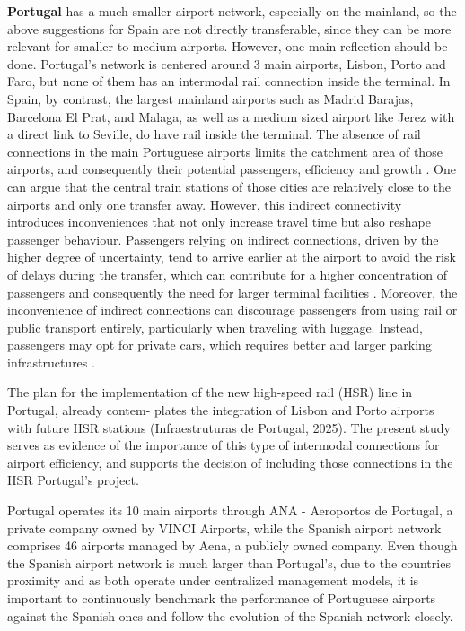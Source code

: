 \textbf{Portugal} has a much smaller airport network, especially on the mainland, so the above suggestions
for Spain are not directly transferable, since they can be more relevant for smaller to medium airports.
However, one main reflection should be done. Portugal's network is centered around 3 main airports, Lisbon, Porto and Faro, but none of them has an intermodal rail connection inside
the terminal. In Spain, by contrast, the largest mainland airports such as Madrid Barajas, Barcelona El
Prat, and Malaga, as well as a medium sized airport like Jerez with a direct link to Seville, do have rail
inside the terminal. The absence of rail connections in the main Portuguese airports limits the catchment
area of those airports, and consequently their potential passengers, efficiency and growth \cite{fernandez2022}. One can argue that the central train stations of those cities are relatively close to the airports and
only one transfer away. However, this indirect connectivity introduces inconveniences that not only increase travel time but also reshape passenger behaviour. Passengers relying on indirect connections,
driven by the higher degree of uncertainty, tend to arrive earlier at the airport to avoid the risk of delays
during the transfer, which can contribute for a higher concentration of passengers and consequently the
need for larger terminal facilities \cite{jiang2021}. Moreover,
the inconvenience of indirect connections can discourage passengers from using rail or public transport entirely, particularly when traveling with luggage. Instead, passengers may opt for private cars, which requires better and larger parking infrastructures \cite{pasha2020}.

The plan for the implementation of the new high-speed rail (HSR) line in Portugal, already contem-
plates the integration of Lisbon and Porto airports with future HSR stations (Infraestruturas de Portugal,
2025). The present study serves as evidence of the importance of this type of intermodal connections
for airport efficiency, and supports the decision of including those connections in the HSR Portugal’s
project.

Portugal operates its 10 main airports through ANA - Aeroportos de Portugal, a private company
owned by VINCI Airports, while the Spanish airport network comprises 46 airports managed by Aena, a
publicly owned company. Even though the Spanish airport network is much larger than Portugal’s, due
to the countries proximity and as both operate under centralized management models, it is important to
continuously benchmark the performance of Portuguese airports against the Spanish ones and follow
the evolution of the Spanish network closely.

